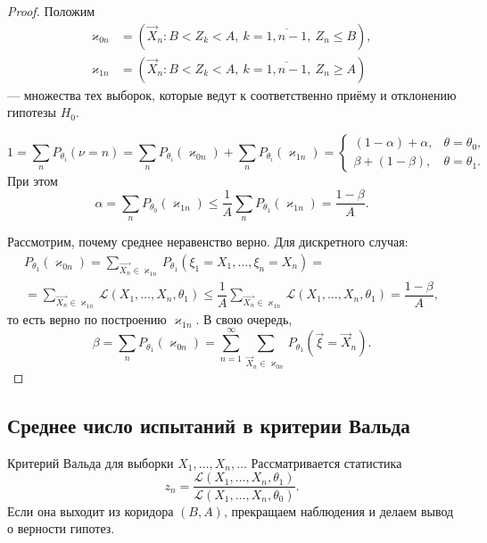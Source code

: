 \begin{proof} 
  Положим
  \begin{align*}
    \varkappa_{0n} &= \left( \vec{X}_n\colon B < Z_k < A,\ k = \overline{1,
      n-1},\ Z_n
      \leqslant B \right),\\ \varkappa_{1n} &= \left( \vec{X}_n\colon B < Z_k <
        A,\ k = \overline{1, n-1},\ Z_n \geqslant A \right)
  \end{align*}
  --- множества тех выборок, которые ведут к соответственно приёму и отклонению гипотезы $ H_0 $.

  \begin{equation*}
    1 = \sum_n P_{\theta_i} (\nu = n) = \sum_n P_{\theta_i} (\varkappa_{0n}) + \sum_n P_{\theta_i} (\varkappa_{1n}) =
    \begin{cases}
      (1 - \alpha) + \alpha, &\theta = \theta_0, \\
      \beta + (1 - \beta), &\theta = \theta_1.
    \end{cases} 
  \end{equation*}
При этом
  \[
    \alpha
    = \sum_n P_{\theta_0} (\varkappa_{1n})
    \leqslant \dfrac{1}{A} \sum_n P_{\theta_1} (\varkappa_{1n})
    = \dfrac{1 - \beta}{A}.
  \]
  
  Рассмотрим, почему среднее неравенство верно. Для дискретного случая:
  \begin{multline*}
    P_{\theta_1} (\varkappa_{0n})
    = \sum_{\vec{X_n} \in \varkappa_{1n}} P_{\theta_1}(\xi_1 = X_1, \dots, \xi_n = X_n) = \\
    = \sum_{\vec{X_n} \in \varkappa_{1n}} \mathcal{L} (X_1, \dots, X_n, \theta_1)
    \leqslant \dfrac{1}{A} \sum_{\vec{X_n} \in \varkappa_{1n}} \mathcal{L} (X_1, \dots, X_n, \theta_1)
    = \dfrac{1 - \beta}{A},
  \end{multline*}
  то есть верно по построению $\varkappa_{1n}$. В свою очередь,
  \[
    \beta = \sum_{n} P_{\theta_1} (\varkappa_{0n})
    = \sum_{n=1}^\infty \sum_{\vec{X}_n \in \varkappa_{0n}} P_{\theta_1} (\vec{\xi}
    = \vec{X}_n).
  \]
\end{proof}


\subsection{Среднее число испытаний в критерии Вальда}
Критерий Вальда для выборки $X_1, \dots, X_n, \dots$
Рассматривается статистика
\[
  z_n = \dfrac{\mathcal{L} (X_1, \dots, X_n, \theta_1)}{\mathcal{L} (X_1, \dots,
  X_n, \theta_0)}.
\]
Если она выходит из коридора $(B, A)$, прекращаем наблюдения и делаем вывод о верности
гипотез.

